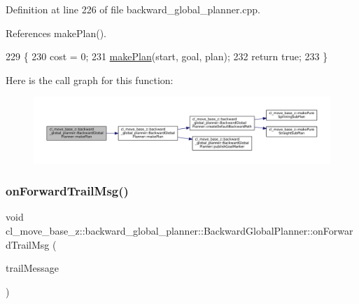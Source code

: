 Definition at line 226 of file backward\+\_\+global\+\_\+planner.\+cpp.



References make\+Plan().


\begin{DoxyCode}
229 \{
230     cost = 0;
231     \hyperlink{classcl__move__base__z_1_1backward__global__planner_1_1BackwardGlobalPlanner_a3f1f3c81e7c52c9305544fd793741a41}{makePlan}(start, goal, plan);
232     \textcolor{keywordflow}{return} \textcolor{keyword}{true};
233 \}
\end{DoxyCode}
Here is the call graph for this function\+:
\nopagebreak
\begin{figure}[H]
\begin{center}
\leavevmode
\includegraphics[width=350pt]{classcl__move__base__z_1_1backward__global__planner_1_1BackwardGlobalPlanner_a2fe289017031d072f4ac32d017fe989d_cgraph}
\end{center}
\end{figure}
\mbox{\label{classcl__move__base__z_1_1backward__global__planner_1_1BackwardGlobalPlanner_a515bde5bfb3ae548f3e19209df1a48b0}} 
\subsubsection{\texorpdfstring{on\+Forward\+Trail\+Msg()}{onForwardTrailMsg()}}
{\footnotesize\ttfamily void cl\+\_\+move\+\_\+base\+\_\+z\+::backward\+\_\+global\+\_\+planner\+::\+Backward\+Global\+Planner\+::on\+Forward\+Trail\+Msg (\begin{DoxyParamCaption}\item[{const nav\+\_\+msgs\+::\+Path\+::\+Const\+Ptr \&}]{trail\+Message }\end{DoxyParamCaption})\hspace{0.3cm}{\ttfamily [private]}}

